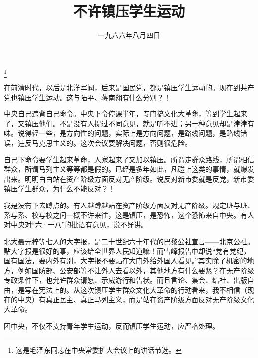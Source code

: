
\title{不许镇压学生运动}
\date{一九六六年八月四日}
\thanks{这是毛泽东同志在中央常委扩大会议上的讲话节选。}
\maketitle


在前清时代，以后是北洋军阀，后来是国民党，都是镇压学生运动的。现在到共产党也镇压学生运动。这与陆平、蒋南翔有什么分别？！

中央自己违背自己命令。中央下令停课半年，专门搞文化大革命，等到学生起来了，又镇压他们。不是没有人提过不同意见，就是听不进；另一种意见却是津津有味。说得轻一些，是方向性的问题，实际上是方向问题，是路线问题，是路线错误，违反马克思主义的。这次会议要解决问题，否则很危险。

自己下命令要学生起来革命，人家起来了又加以镇压。所谓走群众路线，所谓相信群众，所谓马列主义等等都是假的。已经是多年如此，凡碰上这类的事情，就爆发出来。明明白白站在资产阶级方面反对无产阶级。说反对新市委就是反党，新市委镇压学生群众，为什么不能反对？！

我是没有下去蹲点的。有人越蹲越站在资产阶级方面反对无产阶级。规定班与班、系与系、校与校之间一概不许来往，这是镇压，是恐怖，这个恐怖来自中央。有人对中央对“六·一八”的批语有意见，说不好讲。

北大聂元梓等七人的大字报，是二十世纪六十年代的巴黎公社宣言——北京公社。贴大字报是很好的事，应该给全世界人民知道嘛！而雪峰报告中却说“党有党纪，国有国法，要内外有别，大字报不要贴在大门外给外国人看见。”其实除了机密的地方，例如国防部、公安部等不让外人去看以外，其他地方有什么要紧？在无产阶级专政条件下，也允许群众请愿、示威游行和告状。而且言论、集会、结社、出版自由，是写在宪法上的。从这次镇压学生群众文化大革命的行动看来，我不相信（现在的中央）有真正民主、真正马列主义，而是站在资产阶级方面反对无产阶级文化大革命。

团中央，不仅不支持青年学生运动，反而镇压学生运动，应严格处理。

